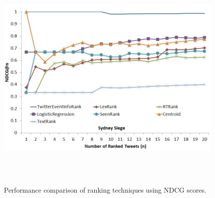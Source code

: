 \begin{figure}[htbp]
\centering
\includegraphics[height=4.5in,width=6in]{Figures/Chapter4Figures/SydneySiegeEventIdentityInfoRankPerformance.jpg}
\caption{\small Performance comparison of ranking techniques using NDCG scores.}
\label{sydneysiegendcg}
\end{figure}


